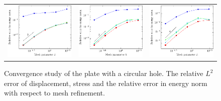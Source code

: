 \documentclass{article}
\begin{document}
\begin{figure}[h]
\begin{tabular}{ccc}
\includegraphics[width=.33\linewidth]{energy_p_2} & \includegraphics[width=.33\linewidth]{energy_p_3} & \includegraphics[width=.33\linewidth]{energy_p_4}
\end{tabular}
    \caption{Convergence study of the plate with a circular hole. The relative $L^2$ error of displacement, stress and the relative error in energy norm with respect to mesh refinement.}
	\label{fig:platewithhole_convergence}
\end{figure}
\end{document}
